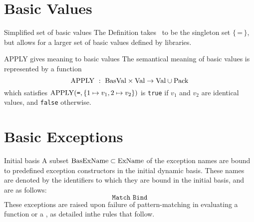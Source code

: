 \begin{comment}{Caution about overloaded notation}
Although the same names (e.g., $\E$ for an environment) are used
as in the static semantics, the objects denoted are different.
This need cause no confusion since the static and dynamic semantics are
presented separately. 
\end{comment}

\section{Basic Values}

\begin{clause}{Simplified set of basic values}
The Definition takes \BasVal\ to be the singleton set
$\{\,\texttt{=}\,\}$, but allows for a larger set of basic values
defined by libraries.
\end{clause}

\begin{clause}{APPLY gives meaning to basic values}
The semantical meaning of basic values is represented by a function
\begin{equation*}
\APPLY\ :\ \BasVal\times\Val\to\Val\cup\Pack
\end{equation*}
which satisfies ${\rm APPLY}(\texttt{=},\{1\mapsto v_{1},2\mapsto v_{2}\})$
is \texttt{true} if $v_{1}$ and $v_{2}$ are identical values, and
\texttt{false} otherwise.
\end{clause}

\begin{comment}{Problems with APPLY}
As Rossberg~\cite[\oldS6]{rossberg2018defects} and
Kahrs~\cite[\oldS\oldS11.1--3]{kahrs1993mistakes} note, the APPLY function has no access to
program state. This implies the library primitives may not be stateful,
and moreover that a lot of interesting primitives (e.g., arrays, I/O
streams, etc.) could not be added to the language without extending the
Definition itself.

But Rossberg observes, any nontrivial library type requires an extension
of the Definition of values or state anyways (and equality types ---
for, e.g., \texttt{array}). The Definition should have contained a
comment regarding this.
\end{comment}

\section{Basic Exceptions}

\begin{clause}{Initial basis}
A subset ${\rm BasExName}\subset{\rm ExName}$ of the exception names are bound to
predefined exception constructors in the initial dynamic basis. These
names are denoted by the identifiers to which they are bound in the
initial basis, and are as follows:
\begin{equation*}
\texttt{Match\ \ Bind}
\end{equation*}
These exceptions are raised upon failure of pattern-matching in
evaluating a function or a \valbind, as detailed inthe rules that follow.
\end{clause}

